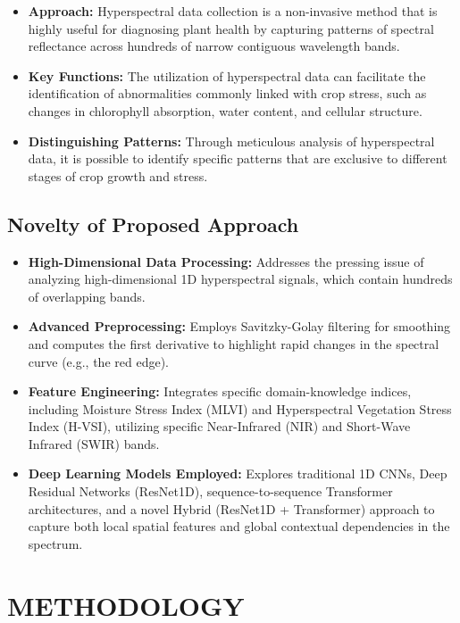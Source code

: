 \documentclass[ 12pt,a4paper,twocolumn,fleqn]{report}
\begin{document}
\begin{itemize}
    \item \textbf{Approach:} Hyperspectral data collection is a non-invasive method that is highly useful for diagnosing plant health by capturing patterns of spectral reflectance across hundreds of narrow contiguous wavelength bands.
    \item \textbf{Key Functions:} The utilization of hyperspectral data can facilitate the identification of abnormalities commonly linked with crop stress, such as changes in chlorophyll absorption, water content, and cellular structure. 
    \item \textbf{Distinguishing Patterns:} Through meticulous analysis of hyperspectral data, it is possible to identify specific patterns that are exclusive to different stages of crop growth and stress. 
\end{itemize}

\section{Novelty of Proposed Approach}
\vspace{2mm}
\begin{itemize}
    \item \textbf{High-Dimensional Data Processing:} Addresses the pressing issue of analyzing high-dimensional 1D hyperspectral signals, which contain hundreds of overlapping bands.
    \item \textbf{Advanced Preprocessing:} Employs Savitzky-Golay filtering for smoothing and computes the first derivative to highlight rapid changes in the spectral curve (e.g., the red edge).
    \item \textbf{Feature Engineering:} Integrates specific domain-knowledge indices, including Moisture Stress Index (MLVI) and Hyperspectral Vegetation Stress Index (H-VSI), utilizing specific Near-Infrared (NIR) and Short-Wave Infrared (SWIR) bands.
    \item \textbf{Deep Learning Models Employed:} Explores traditional 1D CNNs, Deep Residual Networks (ResNet1D), sequence-to-sequence Transformer architectures, and a novel Hybrid (ResNet1D + Transformer) approach to capture both local spatial features and global contextual dependencies in the spectrum.
\end{itemize}

\newpage
  \pagestyle{fancy}

\normalsize
\chapter{METHODOLOGY}
\end{document}
